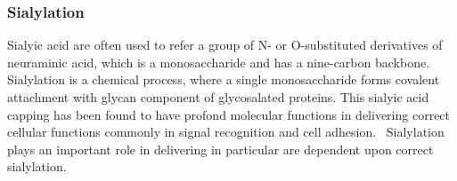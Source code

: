 \subsubsection {Sialylation}
Sialyic acid are often used to refer a group of N- or O-substituted derivatives of neuraminic acid, which is a monosaccharide and has a nine-carbon backbone.~\cite{Vocadlo_2009} Sialylation is a chemical process, where a single monosaccharide forms covalent attachment with glycan component of glycosalated proteins. This sialyic acid capping has been found to have profond molecular functions in delivering correct cellular functions commonly in signal recognition and cell adhesion.~\cite{Bhide_2016} Sialylation plays an important role in delivering in particular are dependent upon correct sialylation.